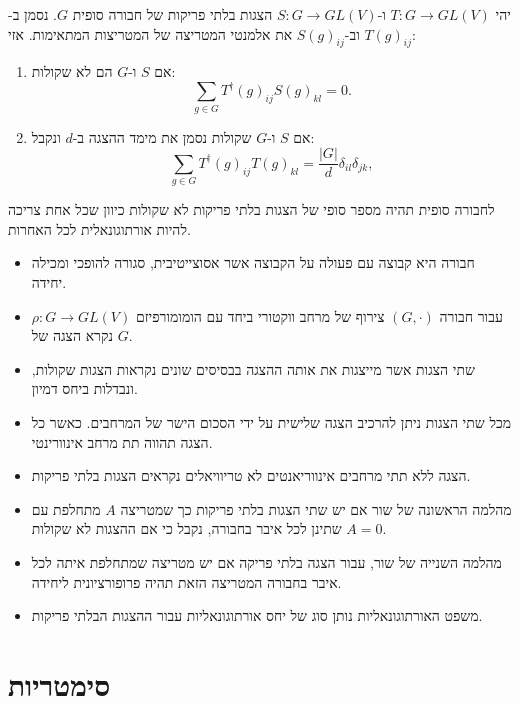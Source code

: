 \documentclass{tstextbook}
\begin{document}
\begin{theorem}[האורתוגונאליות]
יהי \(T:G\to GL(V)\) ו-\(S:G\to GL(V)\) הצגות בלתי פריקות של חבורה סופית \(G\). נסמן ב-\(T(g)_{ij}\) וב-\(S(g)_{ij}\) את אלמנטי המטריצה של המטריצות המתאימות. אזי:

  \begin{enumerate}
    \item אם \(S\) ו-\(G\) הם לא שקולות: 
$$\sum_{g\in G}T^{\dagger}(g)_{i j}S(g)_{k l}=0.$$


    \item אם \(S\) ו-\(G\) שקולות נסמן את מימד ההצגה ב-\(d\) ונקבל: 
$$\sum_{g\in G}T^{\dagger}(g)_{i j}T(g)_{k l}=\frac{|G|}{d}\delta_{i l}\delta_{j k},$$


  \end{enumerate}
\end{theorem}
\begin{corollary}
לחבורה סופית תהיה מספר סופי של הצגות בלתי פריקות לא שקולות כיוון שכל אחת צריכה להיות אורתוגונאלית לכל האחרות.

\end{corollary}
\begin{summary}
  \begin{itemize}
    \item חבורה היא קבוצה עם פעולה על הקבוצה אשר אסוצייטיבית, סגורה להופכי ומכילה יחידה.
    \item עבור חבורה \(\left( G,\cdot \right)\) צירוף של מרחב ווקטורי ביחד עם הומומורפיזם \(\rho:G\to GL(V)\) נקרא הצגה של \(G\).
    \item שתי הצגות אשר מייצגות את אותה ההצגה בבסיסים שונים נקראות הצגות שקולות, ונבדלות ביחס דמיון.
    \item מכל שתי הצגות ניתן להרכיב הצגה שלישית על ידי הסכום הישר של המרחבים. כאשר כל הצגה תהווה תת מרחב אינוורינטי.
    \item הצגה ללא תתי מרחבים אינווריאנטים לא טריוויאלים נקראים הצגות בלתי פריקות.
    \item מהלמה הראשונה של שור אם יש שתי הצגות בלתי פריקות כך שמטריצה \(A\) מתחלפת עם שתינן לכל איבר בחבורה, נקבל כי אם ההצגות לא שקולות \(A=0\).
    \item מהלמה השנייה של שור, עבור הצגה בלתי פריקה אם יש מטריצה שמתחלפת איתה לכל איבר בחבורה המטריצה הזאת תהיה פרופורציונית ליחידה.
    \item משפט האורתוגונאליות נותן סוג של יחס אורתוגונאליות עבור ההצגות הבלתי פריקות.
  \end{itemize}
\end{summary}
\section{סימטריות}
\end{document}
